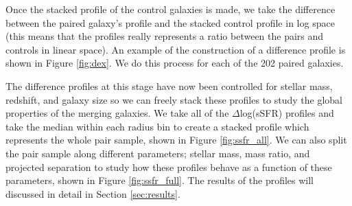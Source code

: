 \documentclass[iop,revtex4,twocolumn,apj,numberedappendix,appendixfloats]{emulateapj}
\begin{document}
Once the stacked profile of the control galaxies is made, we take the difference between the paired galaxy's profile and the stacked control profile in log space (this means that the profiles really represents a ratio between the pairs and controls in linear space). An example of the construction of a difference profile is shown in Figure \ref{fig:dex}. We do this process for each of the 202 paired galaxies. 

The difference profiles at this stage have now been controlled for stellar mass, redshift, and galaxy size so we can freely stack these profiles to study the global properties of the merging galaxies. We take all of the $\Delta$log(sSFR) profiles and take the median within each radius bin to create a stacked profile which represents the whole pair sample, shown in Figure \ref{fig:ssfr_all}. We can also split the pair sample along different parameters; stellar mass, mass ratio, and projected separation to study how these profiles behave as a function of these parameters, shown in Figure \ref{fig:ssfr_full}. The results of the profiles will discussed in detail in Section \ref{sec:results}.

\end{document}
